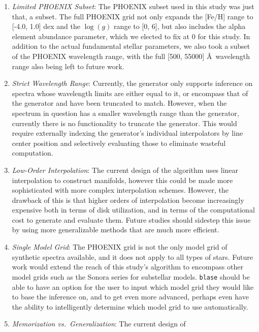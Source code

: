 \documentclass[twocolumn]{aastex631}
\begin{document}
\begin{enumerate}[label=-]
    \item \textit{Limited PHOENIX Subset}: The PHOENIX subset used in this 
    study was just that, a subset. The full PHOENIX grid not only expands 
    the [Fe/H] range to [-4.0, 1.0] dex and the $\log(g)$ range to [0, 6], 
    but also includes the alpha element abundance parameter, which we 
    elected to fix at 0 for this study. In addition to the actual fundamental 
    stellar parameters, we also took a subset of the PHOENIX wavelength range, 
    with the full [500, 55000] \AA \ wavelength range also being left to 
    future work.
    \item \textit{Strict Wavelength Range}: Currently, the generator only 
    supports inference on spectra whose wavelength limits are either equal 
    to it, or encompass that of the generator and have been truncated to 
    match. However, when the spectrum in question has a smaller wavelength 
    range than the generator, currently there is no functionality to truncate 
    the generator. This would require externally indexing the generator's 
    individual interpolators by line center position and selectively
    evaluating those to eliminate wasteful computation.
    \item \textit{Low-Order Interpolation}: The current design of the 
    algorithm uses linear interpolation to construct manifolds, however this
    could be made more sophisticated with more complex interpolation schemes.
    However, the drawback of this is that higher orders of interpolation
    become increasingly expensive both in terms of disk utilization, and 
    in terms of the computational cost to generate and evaluate them. Future
    studies should sidestep this issue by using more generalizable methods
    that are much more efficient.
    \item \textit{Single Model Grid}: The PHOENIX grid is not the only model
    grid of synthetic spectra available, and it does not apply to all types 
    of stars. Future work would extend the reach of this study's algorithm 
    to encompass other model grids such as the Sonora series for substellar
    models. \texttt{blase} should be able to have an option for the user to 
    input which model grid they would like to base the inference on, and 
    to get even more advanced, perhaps even have the ability to intelligently
    determine which model grid to use automatically.
    \item \textit{Memorization vs.\ Generalization}: The current design of

\end{enumerate}
\end{document}
